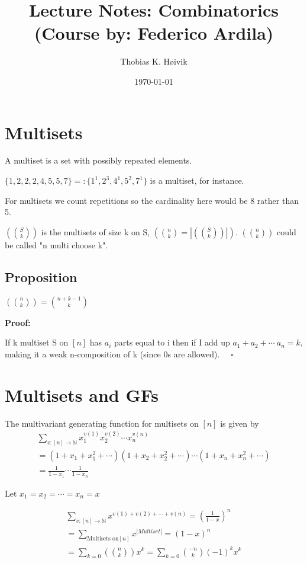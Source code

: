 \documentclass[12pt]{article}
\title{Lecture Notes: Combinatorics (Course by: Federico Ardila)}
\author{Thobias K. Høivik}
\date{\today}
\begin{document}
\maketitle

\section{Multisets}
A multiset is a set with possibly repeated elements.

\noindent 
\(\{1,2,2,2,4,5,5,7\} =: \{1^1, 2^3, 4^1, 5^2, 7^1\}\) is a multiset, for instance.

\noindent
For multisets we count repetitions so the cardinality here would be 8 rather than 5.

\noindent 
\( (\binom{S}{k}) \) is the multisets of size k on S, 
\( (\binom{n}{k} = |(\binom{S}{k})|) \). \((\binom{n}{k})\) could be called 
"n multi choose k".

\subsection*{Proposition}
\( (\binom{n}{k}) = \binom{n+k-1}{k} \)

\noindent
\textbf{Proof: }

\noindent 
If k multiset S on \([n]\) has \(a_i\) parts equal to i then if I add up 
\(a_1 + a_2 + \cdots \ a_n = k\), making it a weak n-composition of k 
(since 0s are allowed). \( \quad \square \)

\section{Multisets and GFs}
The multivariant generating function for multisets on 
\([n]\) is given by 
\begin{gather*} 
  \displaystyle\sum_{v: [n] \rightarrow \mathbb N}
  x_1^{v(1)} x_2^{v(2)} \cdots x_n^{v(n)} \\
  =
  (1+x_1+x_1^2+\cdots)(1+x_2+x_2^2+\cdots)\cdots(1+x_n+x_n^2+\cdots) \\
  = 
  \frac{1}{1-x_1} \cdots \frac{1}{1-x_n}
\end{gather*}

\noindent 
Let \(x_1 = x_2 = \cdots = x_n = x\) 

\begin{gather*} 
  \displaystyle\sum_{v:[n]\rightarrow \mathbb N}
  x^{v(1) + v(2) + \cdots + v(n)}
  = (\frac{1}{1-x})^n \\
  = \displaystyle\sum_{\text{Multisets on} [n]} x^{|Multiset|}
  = (1-x)^n \\ 
  = \displaystyle\sum_{k=0} (\binom{n}{k})x^k
  = \displaystyle\sum_{k=0}\binom{-n}{k}(-1)^k x^k
\end {gather*}
\end{document}
